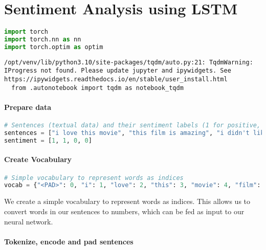 \section{Sentiment Analysis using
LSTM}\label{sentiment-analysis-using-lstm}

\begin{lstlisting}[language=Python]
import torch
import torch.nn as nn
import torch.optim as optim
\end{lstlisting}

\begin{lstlisting}
/opt/venv/lib/python3.10/site-packages/tqdm/auto.py:21: TqdmWarning: IProgress not found. Please update jupyter and ipywidgets. See https://ipywidgets.readthedocs.io/en/stable/user_install.html
  from .autonotebook import tqdm as notebook_tqdm
\end{lstlisting}

\paragraph{Prepare data}\label{prepare-data}

\begin{lstlisting}[language=Python]
# Sentences (textual data) and their sentiment labels (1 for positive, 0 for negative)
sentences = ["i love this movie", "this film is amazing", "i didn't like it", "it was terrible"]
sentiment = [1, 1, 0, 0]
\end{lstlisting}

\paragraph{Create Vocabulary}\label{create-vocabulary}

\begin{lstlisting}[language=Python]
# Simple vocabulary to represent words as indices
vocab = {"<PAD>": 0, "i": 1, "love": 2, "this": 3, "movie": 4, "film": 5, "is": 6, "amazing": 7, "didn't": 8, "like": 9, "it": 10, "was": 11, "terrible": 12}
\end{lstlisting}

We create a simple vocabulary to represent words as indices. This allows
us to convert words in our sentences to numbers, which can be fed as
input to our neural network.

\paragraph{Tokenize, encode and pad
sentences}\label{tokenize-encode-and-pad-sentences}

